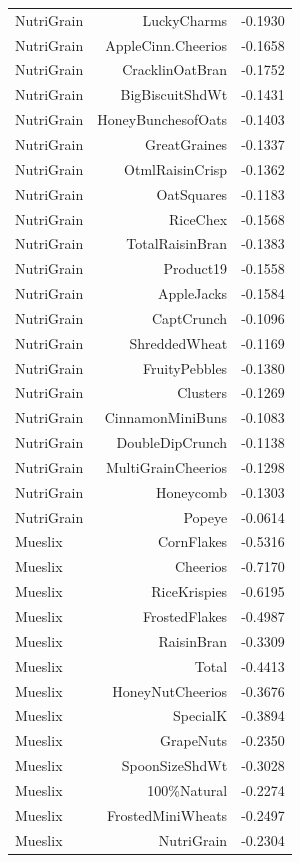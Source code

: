 \begin{longtable}{@{}lrr@{}}
NutriGrain & LuckyCharms & -0.1930 \\
NutriGrain & AppleCinn.Cheerios & -0.1658 \\
NutriGrain & CracklinOatBran & -0.1752 \\
NutriGrain & BigBiscuitShdWt & -0.1431 \\
NutriGrain & HoneyBunchesofOats & -0.1403 \\
NutriGrain & GreatGraines & -0.1337 \\
NutriGrain & OtmlRaisinCrisp & -0.1362 \\
NutriGrain & OatSquares & -0.1183 \\
NutriGrain & RiceChex & -0.1568 \\
NutriGrain & TotalRaisinBran & -0.1383 \\
NutriGrain & Product19 & -0.1558 \\
NutriGrain & AppleJacks & -0.1584 \\
NutriGrain & CaptCrunch & -0.1096 \\
NutriGrain & ShreddedWheat & -0.1169 \\
NutriGrain & FruityPebbles & -0.1380 \\
NutriGrain & Clusters & -0.1269 \\
NutriGrain & CinnamonMiniBuns & -0.1083 \\
NutriGrain & DoubleDipCrunch & -0.1138 \\
NutriGrain & MultiGrainCheerios & -0.1298 \\
NutriGrain & Honeycomb & -0.1303 \\
NutriGrain & Popeye & -0.0614 \\
Mueslix & CornFlakes & -0.5316 \\
Mueslix & Cheerios & -0.7170 \\
Mueslix & RiceKrispies & -0.6195 \\
Mueslix & FrostedFlakes & -0.4987 \\
Mueslix & RaisinBran & -0.3309 \\
Mueslix & Total & -0.4413 \\
Mueslix & HoneyNutCheerios & -0.3676 \\
Mueslix & SpecialK & -0.3894 \\
Mueslix & GrapeNuts & -0.2350 \\
Mueslix & SpoonSizeShdWt & -0.3028 \\
Mueslix & 100\%Natural & -0.2274 \\
Mueslix & FrostedMiniWheats & -0.2497 \\
Mueslix & NutriGrain & -0.2304 \\

\end{longtable}
